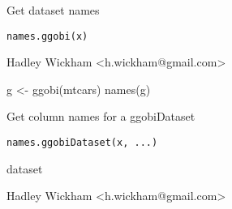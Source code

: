 \documentclass{article}
\begin{document}
\begin{Description}\relax
Get dataset names
\end{Description}
\begin{Usage}
\begin{verbatim}names.ggobi(x)\end{verbatim}
\end{Usage}
\begin{Arguments}
\begin{ldescription}
\item[\code{x}] 
\end{ldescription}
\end{Arguments}
\begin{Details}\relax
\end{Details}
\begin{Author}\relax
Hadley Wickham <h.wickham@gmail.com>
\end{Author}
\begin{Examples}
\begin{ExampleCode}g <- ggobi(mtcars)
names(g)\end{ExampleCode}
\end{Examples}

\begin{Description}\relax
Get column names for a ggobiDataset
\end{Description}
\begin{Usage}
\begin{verbatim}names.ggobiDataset(x, ...)\end{verbatim}
\end{Usage}
\begin{Arguments}
\begin{ldescription}
\item[\code{x}] dataset
\item[\code{...}] 
\end{ldescription}
\end{Arguments}
\begin{Details}\relax
\end{Details}
\begin{Author}\relax
Hadley Wickham <h.wickham@gmail.com>
\end{Author}
\begin{Examples}
\begin{ExampleCode}\end{ExampleCode}
\end{Examples}
\end{document}
